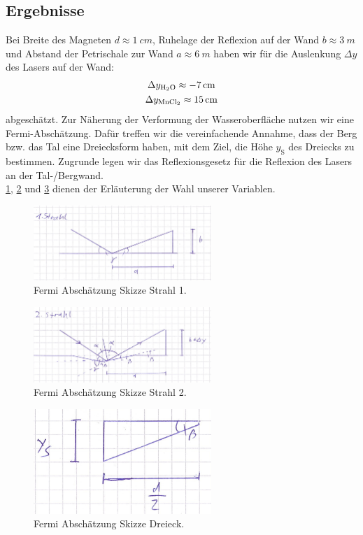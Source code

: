 \documentclass[
	a4paper,
	12pt,
	pagesize,
	ngerman
]{scrartcl}
\begin{document}
	\subsection{Ergebnisse}
	Bei Breite des Magneten $d \approx \SI{1}{cm}$, Ruhelage der Reflexion auf der Wand $b \approx \SI{3}{m}$ und Abstand der Petrischale zur Wand $a \approx \SI{6}{m}$ haben wir für die Auslenkung $\Delta y$ des Lasers auf der Wand: \newline
	\begin{gather*} 
		\Delta y_\text{\ce{H2O}} \approx \SI{-7}{cm} \\
		\Delta y_\text{\ce{MnCl2}} \approx \SI{15}{cm}
	\end{gather*}
	abgeschätzt.
	Zur Näherung der Verformung der Wasseroberfläche nutzen wir eine Fermi-Abschätzung. Dafür treffen wir die vereinfachende Annahme, dass der Berg bzw. das Tal eine Dreiecksform haben, mit dem Ziel, die Höhe $y_\text{S}$ des Dreiecks zu bestimmen. Zugrunde legen wir das Reflexionsgesetz für die Reflexion des Lasers an der Tal-/Bergwand.\\
	\cref{Fermi1}, \cref{Fermi2} und \cref{Fermi3} dienen der Erläuterung der Wahl unserer Variablen.
	\begin{figure}[htb]
	  \centering
	    \includegraphics[width=0.6\textwidth]{Fermi1} 
	  \caption{Fermi Abschätzung Skizze Strahl 1.}
		\label{Fermi1}
	\end{figure}
	\begin{figure}[htb]
	  \centering
	    \includegraphics[width=0.6\textwidth]{Fermi2} 
	  \caption{Fermi Abschätzung Skizze Strahl 2.}
		\label{Fermi2}
	\end{figure}
	\begin{figure}[htb]
	  \centering
	    \includegraphics[width=0.6\textwidth]{Fermi3} 
	  \caption{Fermi Abschätzung Skizze Dreieck.}
		\label{Fermi3}
	\end{figure}
	
\end{document}

